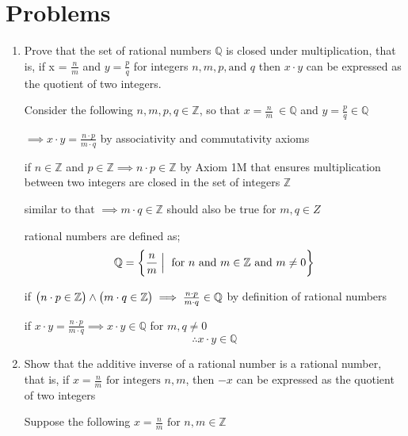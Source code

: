 \documentclass{article}
\newcommand{\paren}[1]{\mathopen{}\left( {#1}_{{}_{}}\,\negthickspace\right)\mathclose{}} %
\newcommand{\braces}[1]{\mathopen{}\left\{ {#1}_{{}_{}}\,\negthickspace\right\}\mathclose{}}
\begin{document}
\section{Problems}
\begin{enumerate}[start = 8, label = {\bfseries Problem \arabic*:}, leftmargin=1in] 
    \item Prove that the set of rational numbers \(\mathbb{Q}\) is closed under multiplication, that is, if x
        = \(\frac{n}{m}\) and \(y = \frac{p}{q}\) for integers \(n, m, p, \text{and } q\) then 
        \(x\cdot y\) can be expressed as the quotient of two integers. 
    
        \vspace{1em}
        Consider the following \(n, m, p, q \in \mathbb{Z}\), so that \(x = \frac{n}{m}\ \in 
        \mathbb{Q}\) and \(y = \frac{p}{q} \in \mathbb{Q}\)

        \(\implies x \cdot y = \frac{n \cdot p}{m \cdot q}\) by associativity and commutativity axioms
        
        if \(n \in \mathbb{Z}\) and \(p \in \mathbb{Z} \implies n \cdot p \in \mathbb{Z}\)
        by Axiom 1M that ensures multiplication between two integers are closed in the set
        of integers \(\mathbb{Z}\)

        similar to that \( \implies m \cdot q \in \mathbb{Z}\) should also be true for \(m, q \in Z\)

        rational numbers are defined as;
        \[
            \mathbb{Q} = \braces{\frac{n}{m} \mathrel{\Big|} \text{ for } n \text{ and } m \in \mathbb{Z} \text{ and } m \neq 0}
        \]

        if \(\paren{n \cdot p \in \mathbb{Z}} \land \paren{m \cdot q \in \mathbb{Z}} \implies 
        \frac{n \cdot p}{m \cdot q} \in \mathbb{Q}\) by definition of rational numbers 

        if \(x \cdot y = \frac{n\cdot p}{m \cdot q} \implies x \cdot y \in \mathbb{Q}\) for \(m, q \neq 0\)
        \[
        \therefore x\cdot y \in \mathbb{Q}
        \]

    \item Show that the additive inverse of a rational number is a rational number, that is, if \(x = 
        \frac{n}{m} \text{ for integers } n, m\), then \(-x\) can be expressed as the quotient of two integers
        
        \vspace{1em}
        Suppose the following \(x = \frac{n}{m} \text{ for } n, m \in \mathbb{Z}\)
        

\end{enumerate}
\end{document}

